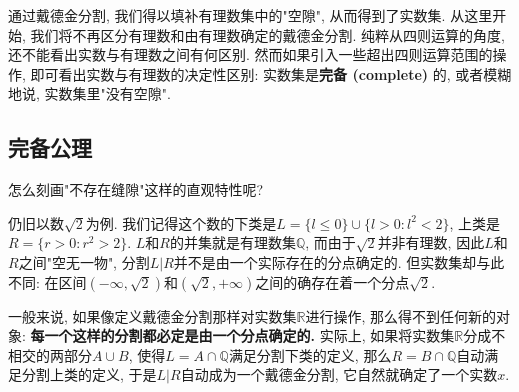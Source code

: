 

通过戴德金分割, 我们得以填补有理数集中的"空隙", 从而得到了实数集. 从这里开始, 我们将不再区分有理数和由有理数确定的戴德金分割. 纯粹从四则运算的角度, 还不能看出实数与有理数之间有何区别. 然而如果引入一些超出四则运算范围的操作, 即可看出实数与有理数的决定性区别: 实数集是\textbf{完备 (complete)} 的, 或者模糊地说, 实数集里"没有空隙".

\subsection{完备公理}

怎么刻画"不存在缝隙"这样的直观特性呢?

仍旧以数$\sqrt{2}$为例. 我们记得这个数的下类是$L=\{l\leq0\}\cup\{l>0:l^2<2\}$, 上类是$R=\{r>0:r^2>2\}$. $L$和$R$的并集就是有理数集$\mathbb{Q}$, 而由于$\sqrt{2}$并非有理数, 因此$L$和$R$之间"空无一物", 分割$L|R$并不是由一个实际存在的分点确定的. 但实数集却与此不同: 在区间$(-\infty,\sqrt{2})$和$(\sqrt{2},+\infty)$之间的确存在着一个分点$\sqrt{2}$. 

一般来说, 如果像定义戴德金分割那样对实数集$\mathbb{R}$进行操作, 那么得不到任何新的对象: \textbf{每一个这样的分割都必定是由一个分点确定的.} 实际上, 如果将实数集$\mathbb{R}$分成不相交的两部分$A\cup B$, 使得$L=A\cap\mathbb{Q}$满足分割下类的定义, 那么$R=B\cap\mathbb{Q}$自动满足分割上类的定义, 于是$L|R$自动成为一个戴德金分割, 它自然就确定了一个实数$x$. 